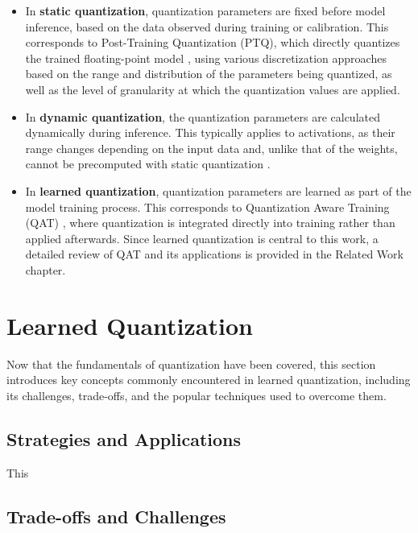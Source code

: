     \begin{itemize}
        \item In \textbf{static quantization}, quantization parameters are fixed before model inference, based on the data observed during training or calibration.
        This corresponds to Post-Training Quantization (PTQ), which directly quantizes the trained floating-point model \cite{jiang2021efficient}, 
        using various discretization approaches based on the range and distribution of the parameters being quantized, 
        as well as the level of granularity at which the quantization values are applied.
        
        \item In \textbf{dynamic quantization}, the quantization parameters are calculated dynamically during inference. 
        This typically applies to activations, as their range changes depending on the input data and, unlike that of the weights, 
        cannot be precomputed with static quantization \cite{kim2021ibert}.
        
        \item In \textbf{learned quantization}, quantization parameters are learned as part of the model training process.
        This corresponds to Quantization Aware Training (QAT) \cite{jacob2018quantization}, where quantization is integrated directly into training rather than applied afterwards.
        Since learned quantization is central to this work, a detailed review of QAT and its applications is provided in the Related Work chapter. 

    \end{itemize}


\section{Learned Quantization}
\label{sec:section3}
Now that the fundamentals of quantization have been covered, 
this section introduces key concepts commonly encountered in learned quantization,
including its challenges, trade-offs, and the popular techniques used to overcome them.

\subsection{Strategies and Applications}
\label{subsec:subsection1}
This

\subsection{Trade-offs and Challenges}
\label{subsec:subsection2}

